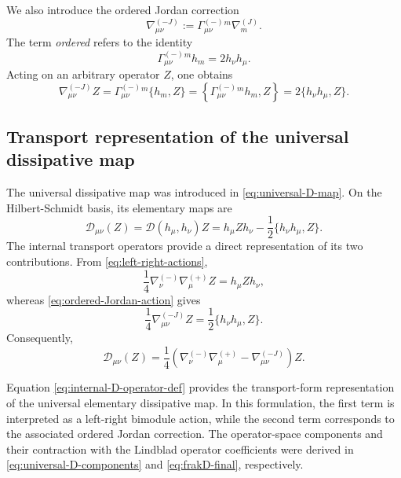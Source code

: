 \documentclass[notitlepage,aip,reprint,onecolumn]{revtex4-1}
\theoremstyle{definition}
\begin{document}
We also introduce the ordered Jordan correction
\begin{equation}\label{eq:anchor-D-def}
    \nabla^{(-J)}_{\mu\nu}
    :=
    \Gamma^{(-)}_{\mu\nu}{}^m
    \nabla^{(J)}_m.
\end{equation}
The term \emph{ordered} refers to the identity
\[
    \Gamma^{(-)}_{\mu\nu}{}^m h_m
    =
    2h_\nu h_\mu.
\]
Acting on an arbitrary operator \(Z\), one obtains
\begin{equation}\label{eq:ordered-Jordan-action}
    \nabla^{(-J)}_{\mu\nu}Z
    =
    \Gamma^{(-)}_{\mu\nu}{}^m
    \{h_m,Z\}
    =
    \left\{
    \Gamma^{(-)}_{\mu\nu}{}^m h_m,
    Z
    \right\}
    =2\{h_\nu h_\mu,Z\}.
\end{equation}

\subsection{Transport representation of the universal dissipative map}

The universal dissipative map was introduced in \eqref{eq:universal-D-map}. On the Hilbert-Schmidt basis, its elementary maps are
\[
    \mathcal D_{\mu\nu}(Z)
    =
    \mathcal D(h_\mu,h_\nu)Z
    =
    h_\mu Z h_\nu
    -
    \frac12\{h_\nu h_\mu,Z\}.
\]
The internal transport operators provide a direct representation of its two contributions. From  \eqref{eq:left-right-actions},
\[
    \frac14
    \nabla^{(-)}_\nu
    \nabla^{(+)}_\mu Z
    =
    h_\mu Z h_\nu,
\]
whereas  \eqref{eq:ordered-Jordan-action} gives
\[
    \frac14
    \nabla^{(-J)}_{\mu\nu}Z
    =
    \frac12\{h_\nu h_\mu,Z\}.
\]
Consequently,
\begin{equation}\label{eq:internal-D-operator-def}
    \mathcal D_{\mu\nu}(Z)
    =
    \frac14
    \left(
    \nabla^{(-)}_\nu\nabla^{(+)}_\mu
    -
    \nabla^{(-J)}_{\mu\nu}
    \right)Z.
\end{equation}

Equation \eqref{eq:internal-D-operator-def} provides the transport-form representation of the universal elementary dissipative map. In this formulation, the first term is interpreted as a left-right bimodule action, while the second term corresponds to the associated ordered Jordan correction. The operator-space components and their contraction with the Lindblad operator coefficients were derived in \eqref{eq:universal-D-components} and \eqref{eq:frakD-final}, respectively.
\end{document}
